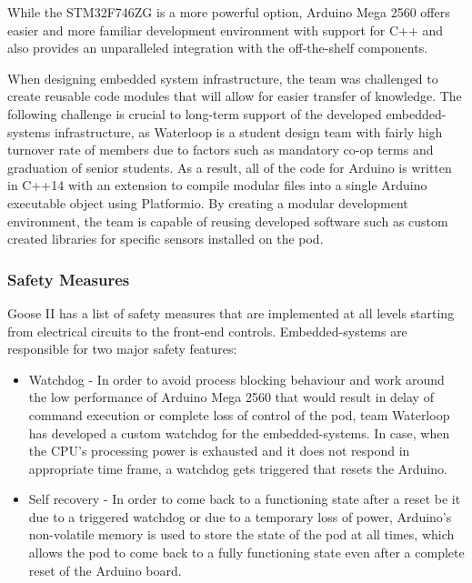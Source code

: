 \documentclass[11pt,a4paper,oldfontcommands]{memoir}
\begin{document}
																																																																																   While the STM32F746ZG is a more powerful option, Arduino Mega 2560 offers easier and more familiar development environment with support for C++ and also provides an unparalleled integration with the off-the-shelf components.

																																																																																   When designing embedded system infrastructure, the team was challenged to create reusable code modules that will allow for easier transfer of knowledge. The following challenge is crucial to long-term support of the developed embedded-systems infrastructure, as Waterloop is a student design team with fairly high turnover rate of members due to factors such as mandatory co-op terms and graduation of senior students. As a result, all of the code for Arduino is written in C++14 with an extension to compile modular files into a single Arduino executable object using Platformio. By creating a modular development environment, the team is capable of reusing developed software such as custom created libraries for specific sensors installed on the pod.

																																																																																   \subsubsection{Safety Measures}
																																																																																   Goose II has a list of safety measures that are implemented at all levels starting from electrical circuits to the front-end controls. Embedded-systems are responsible for two major safety features:
																																																																																   \begin{itemize}
																																																																																       \item Watchdog - In order to avoid process blocking behaviour and work around the low performance of Arduino Mega 2560 that would result in delay of command execution or complete loss of control of the pod, team Waterloop has developed a custom watchdog for the embedded-systems. In case, when the CPU's processing power is exhausted and it does not respond in appropriate time frame, a watchdog gets triggered that resets the Arduino.
																																																																																           \item Self recovery -  In order to come back to a functioning state after a reset be it due to a triggered watchdog or due to a temporary loss of power, Arduino's non-volatile memory is used to store the state of the pod at all times, which allows the pod to come back to a fully functioning state even after a complete reset of the Arduino board.
																																																																																	   \end{itemize}
\end{document}
